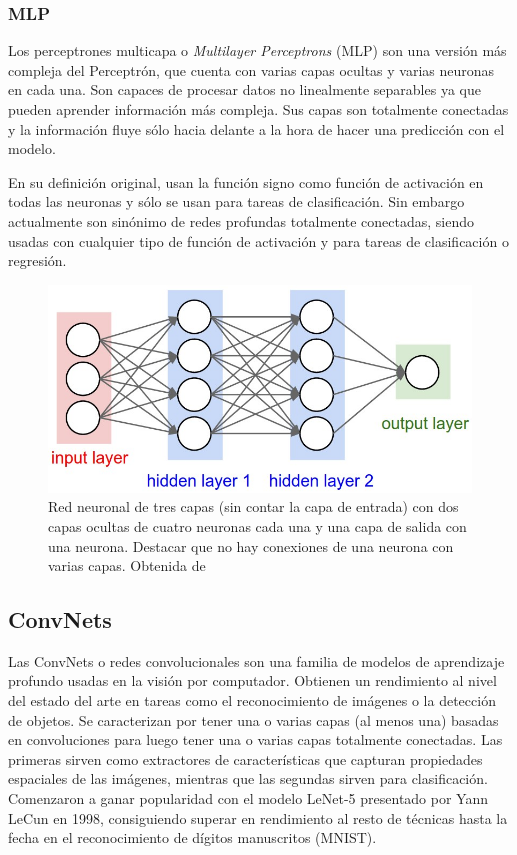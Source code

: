 \subsubsection{MLP}

Los perceptrones multicapa o \textit{Multilayer Perceptrons} (MLP) son una versión más compleja del Perceptrón, que cuenta con varias capas ocultas y varias neuronas en cada una. Son capaces de procesar datos no linealmente separables ya que pueden aprender información más compleja. Sus capas son totalmente conectadas y la información fluye sólo hacia delante a la hora de hacer una predicción con el modelo. 

En su definición original, usan la función signo como función de activación en todas las neuronas y sólo se usan para tareas de clasificación. Sin embargo actualmente son sinónimo de redes profundas totalmente conectadas, siendo usadas con cualquier tipo de función de activación y para tareas de clasificación o regresión.

\begin{figure}
    \centering
    \includegraphics[width=0.75\linewidth]{Plantilla_TFG_latex//imagenes//Inf//2.Fund/neural_net2.jpeg}
    \caption{Red neuronal de tres capas (sin contar la capa de entrada) con dos capas ocultas de cuatro neuronas cada una y una capa de salida con una neurona. Destacar que no hay conexiones de una neurona con varias capas. Obtenida de \cite{stanford_231}}
    \label{fig:NeuralNet}
\end{figure}


\subsection{ConvNets}
\label{sec:convnets}

Las ConvNets o redes convolucionales son una familia de modelos de aprendizaje profundo usadas en la visión por computador. Obtienen un rendimiento al nivel del estado del arte en tareas como el reconocimiento de imágenes o la detección de objetos. Se caracterizan por tener una o varias capas (al menos una) basadas en convoluciones para luego tener una o varias capas totalmente conectadas. Las primeras sirven como extractores de características que capturan propiedades espaciales de las imágenes, mientras que las segundas sirven para clasificación. Comenzaron a ganar popularidad con el modelo LeNet-5 \cite{lenet5} presentado por Yann LeCun en 1998, consiguiendo superar en rendimiento al resto de técnicas hasta la fecha en el reconocimiento de dígitos manuscritos (MNIST).

